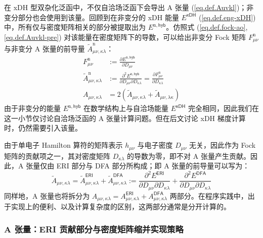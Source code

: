 在 xDH 型双杂化泛函中，不仅自洽场泛函下会导出 A 张量 (\ref{eq.def.Auvkl})；非变分部分也会使用到该量。回顾到在非变分的 xDH 能量 $E^\textsf{xDH}$ (\ref{eq.def.eng-xDH}) 中，所有仅与密度矩阵相关的部分被提取出为 $E^{\mathrm{n}, \textsf{hyb}}$。仿照式 (\ref{eq.def.fock-ao}, \ref{eq.def.Auvkl-pre}) 对该能量在密度矩阵下的导数，可以给出非变分 Fock 矩阵 $F_{\mu \nu}^\mathrm{n}$ 与非变分 A 张量的前导量 $\tilde A_{\mu \nu, \kappa \lambda}^\mathrm{n}$：
\begin{align}
  F_{\mu \nu}^\mathrm{n} &:= \frac{\partial E^{\mathrm{n}, \textsf{hyb}}}{\partial D_{\mu \nu}} \\
  \tilde A_{\mu \nu, \kappa \lambda}^\mathrm{n} &:= \frac{\partial^2 E^{\mathrm{n}, \textsf{hyb}}}{\partial D_{\mu \nu} \partial D_{\kappa \lambda}} = \frac{\partial F_{\mu \nu}^\mathrm{n}}{\partial D_{\kappa \lambda}} \\
  A_{\mu \nu, \kappa \lambda} &= 2 (\tilde A_{\mu \nu, \kappa \lambda} + \tilde A_{\mu \nu, \lambda \kappa})
\end{align}
由于非变分的能量 $E^{\mathrm{n}, \textsf{hyb}}$ 在数学结构上与自洽场能量 $E^\textsf{xDH}$ 完全相同，因此我们在这一小节仅讨论自洽场泛函的 A 张量计算问题。但在后文讨论 xDH 梯度计算时，仍然需要引入该量。

由于单电子 Hamilton 算符的矩阵表示 $h_{\mu \nu}$ 与电子密度 $D_{\mu \nu}$ 无关，因此作为 Fock 矩阵的贡献项之一，其对密度矩阵 $D_{\kappa \lambda}$ 的导数为零，即不对 A 张量产生贡献。因此，A 张量仅由 ERI 部分与 DFA 部分所构成；即 A 张量的前导量可以写为：
\begin{equation}
  \tilde A_{\mu \nu, \kappa \lambda} = \tilde A_{\mu \nu, \kappa \lambda}^\textsf{ERI} + \tilde A_{\mu \nu, \kappa \lambda}^\textsf{DFA} := \frac{\partial^2 E^\textsf{ERI}}{\partial D_{\mu \nu} \partial D_{\kappa \lambda}} + \frac{\partial^2 E^\textsf{DFA}}{\partial D_{\mu \nu} \partial D_{\kappa \lambda}}
\end{equation}
同样地，A 张量也将拆分为 $A_{\mu \nu, \kappa \lambda} = A_{\mu \nu, \kappa \lambda}^\textsf{ERI} + A_{\mu \nu, \kappa \lambda}^\textsf{DFA}$ 两部分。在程序实践中，出于实现上的便利、以及计算复杂度的区别，这两部分通常是分开计算的。

\subsubsection{A 张量：ERI 贡献部分与密度矩阵缩并实现策略}

